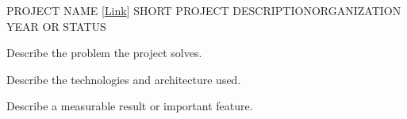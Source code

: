
\resumeProject
  {PROJECT NAME [\href{https://example.com}{Link}]}
  {SHORT PROJECT DESCRIPTION}{ORGANIZATION}
  {YEAR OR STATUS}
  \resumeItemListStart
      \item{Describe the problem the project solves.}
      \item{Describe the technologies and architecture used.}
      \item{Describe a measurable result or important feature.}
  \resumeItemListEnd
\vspace{2mm}
